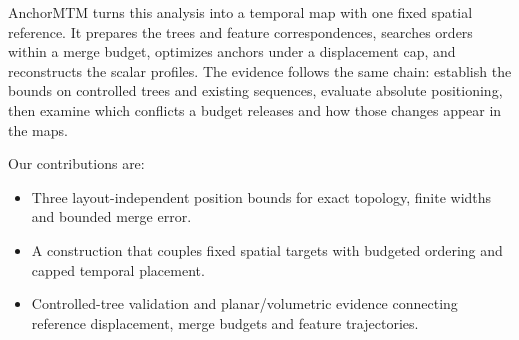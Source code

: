 AnchorMTM turns this analysis into a temporal map with one fixed spatial reference. It prepares the trees and feature correspondences, searches orders within a merge budget, optimizes anchors under a displacement cap, and reconstructs the scalar profiles. The evidence follows the same chain: establish the bounds on controlled trees and existing sequences, evaluate absolute positioning, then examine which conflicts a budget releases and how those changes appear in the maps.

Our contributions are:
\begin{itemize}\setlength{\itemsep}{1pt}\setlength{\parsep}{0pt}
\item Three layout-independent position bounds for exact topology, finite widths and bounded merge error.
\item A construction that couples fixed spatial targets with budgeted ordering and capped temporal placement.
\item Controlled-tree validation and planar/volumetric evidence connecting reference displacement, merge budgets and feature trajectories.
\end{itemize}
